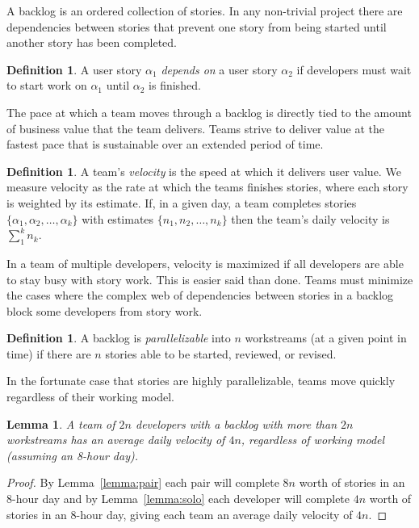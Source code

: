 \documentclass[letterpaper]{article}
\newtheorem{lemma}[theorem]{Lemma}
\theoremstyle{definition}
\newtheorem{definition}[theorem]{Definition}
\begin{document}
    A backlog is an ordered collection of stories.
    In any non-trivial project there are dependencies between stories that prevent one story from being started until
    another story has been completed.

    \begin{definition}
        A user story $\alpha_1$ \textit{depends on} a user story $\alpha_2$ if developers must wait to start work on
        $\alpha_1$ until $\alpha_2$ is finished.
    \end{definition}

    The pace at which a team moves through a backlog is directly tied to the amount of business value that the team
    delivers.
    Teams strive to deliver value at the fastest pace that is sustainable over an extended period of time.

    \begin{definition}
        A team's \textit{velocity} is the speed at which it delivers user value.
        We measure velocity as the rate at which the teams finishes stories, where each story is weighted by its
        estimate.
        If, in a given day, a team completes stories $\{\alpha_1, \alpha_2,\dots,\alpha_k\}$ with estimates
        $\{n_1, n_2,\dots,n_k\}$ then the team's daily velocity is $\sum_1^k n_k$.
    \end{definition}

    In a team of multiple developers, velocity is maximized if all developers are able to stay busy with story work.
    This is easier said than done.
    Teams must minimize the cases where the complex web of dependencies between stories in a backlog block some
    developers from story work.

    \begin{definition}
        A backlog is \textit{parallelizable} into $n$ workstreams (at a given point in time) if there are $n$ stories
        able to be started, reviewed, or revised.
    \end{definition}

    In the fortunate case that stories are highly parallelizable, teams move quickly regardless of their working model.

    \begin{lemma}
        \label{lemma:parallel}
        A team of $2n$ developers with a backlog with more than $2n$ workstreams has an average daily velocity of $4n$,
        regardless of working model (assuming an 8-hour day).
    \end{lemma}
    \begin{proof}
        By Lemma~\ref{lemma:pair} each pair will complete $8n$ worth of stories in an 8-hour day and by
        Lemma~\ref{lemma:solo} each developer will complete $4n$ worth of stories in an 8-hour day, giving each team an
        average daily velocity of $4n$.
    \end{proof}
\end{document}
